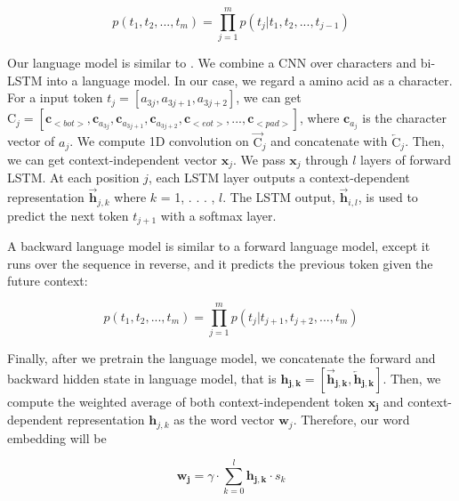 \documentclass{article}
\begin{document}
        \begin{equation}
            p(t_{1}, t_{2}, ..., t_{m}) = \prod_{j=1}^{m} p(t_{j}|t_{1}, t_{2}, ..., t_{j-1})
        \end{equation}

        Our language model is similar to \citep{DBLP:journals/corr/JozefowiczVSSW16,DBLP:journals/corr/KimJSR15}. We combine a CNN over characters and bi-LSTM into a language model. In our case, we regard a amino acid as a character. For a input token $t_{j} = [a_{3j}, a_{3j+1}, a_{3j+2}]$, we can get $\mbox{C}_{j} = [\mathbf{c}_{<bot>}, \mathbf{c}_{a_{3j}}, \mathbf{c}_{a_{3j+1}}, \mathbf{c}_{a_{3j+2}}, \mathbf{c}_{<eot>}, ..., \mathbf{c}_{<pad>}]$, where $\mathbf{c}_{a_{j}}$ is the character vector of $a_{j}$. We compute 1D convolution on $\overrightarrow{\mbox{C}}_{j}$ and concatenate with $\overleftarrow{\mbox{C}}_{j}$. Then, we can get context-independent vector $\mathbf{x}_{j}$. We pass $\mathbf{x}_{j}$ through $l$ layers of forward LSTM. At each position $j$, each LSTM layer outputs a context-dependent representation $\overrightarrow{\mathbf{h}}_{j,k}$ where $k$ = 1, . . . , $l$. The LSTM output, $\overrightarrow{\mathbf{h}}_{i,l}$, is used to predict the next token ${t_{j+1}}$ with a softmax layer. \par
        A backward language model is similar to a forward language model, except it runs over the sequence in reverse, and it predicts the previous token given the future context:
        
        \begin{equation}
            p(t_{1}, t_{2}, ..., t_{m}) = \prod_{j=1}^{m} p(t_{j}|t_{j+1}, t_{j+2}, ..., t_{m})
        \end{equation}
        
        Finally, after we pretrain the language model, we concatenate the forward and backward hidden state in language model, that is $\mathbf{h_{j,k}} = [\mathbf{\overrightarrow{\mathbf{h}}_{j,k}}, \mathbf{\overleftarrow{\mathbf{h}}_{j, k}}]$. Then, we compute the weighted average of both context-independent token $\mathbf{x_{j}}$ and context-dependent representation ${\mathbf{h}}_{j, k}$ as the word vector $\mathbf{w}_{j}$. Therefore, our word embedding will be 
        
        \begin{equation}
            \mathbf{w_{j}} = \gamma  \cdot \sum_{k=0}^{l} \mathbf{h_{j, k}}\cdot s_{k}
        \end{equation}
        
\end{document}
